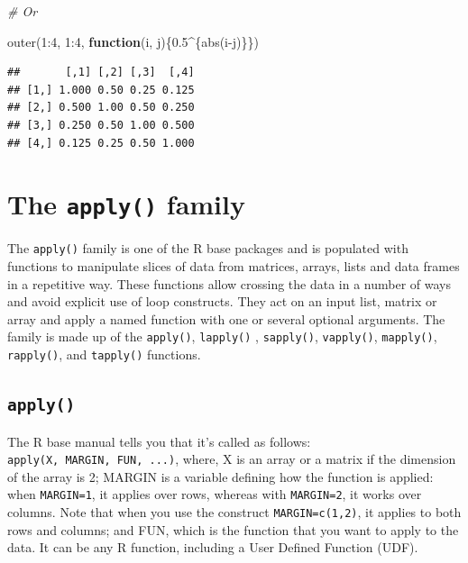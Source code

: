 \documentclass[
]{book}
\newenvironment{Shaded}{\begin{snugshade}}{\end{snugshade}}
\newcommand{\CommentTok}[1]{\textcolor[rgb]{0.56,0.35,0.01}{\textit{#1}}}
\newcommand{\ControlFlowTok}[1]{\textcolor[rgb]{0.13,0.29,0.53}{\textbf{#1}}}
\newcommand{\DecValTok}[1]{\textcolor[rgb]{0.00,0.00,0.81}{#1}}
\newcommand{\FloatTok}[1]{\textcolor[rgb]{0.00,0.00,0.81}{#1}}
\newcommand{\FunctionTok}[1]{\textcolor[rgb]{0.00,0.00,0.00}{#1}}
\newcommand{\NormalTok}[1]{#1}
\newcommand{\SpecialCharTok}[1]{\textcolor[rgb]{0.00,0.00,0.00}{#1}}
\begin{document}
\begin{Shaded}
\begin{Highlighting}[]
\CommentTok{\# Or}

\FunctionTok{outer}\NormalTok{(}\DecValTok{1}\SpecialCharTok{:}\DecValTok{4}\NormalTok{, }\DecValTok{1}\SpecialCharTok{:}\DecValTok{4}\NormalTok{, }\ControlFlowTok{function}\NormalTok{(i, j)\{}\FloatTok{0.5}\SpecialCharTok{\^{}}\NormalTok{\{}\FunctionTok{abs}\NormalTok{(i}\SpecialCharTok{{-}}\NormalTok{j)\}\})}
\end{Highlighting}
\end{Shaded}

\begin{verbatim}
##       [,1] [,2] [,3]  [,4]
## [1,] 1.000 0.50 0.25 0.125
## [2,] 0.500 1.00 0.50 0.250
## [3,] 0.250 0.50 1.00 0.500
## [4,] 0.125 0.25 0.50 1.000
\end{verbatim}

\hypertarget{the-apply-family}{%
\section{\texorpdfstring{The \texttt{apply()} family}{The apply() family}}\label{the-apply-family}}

The \texttt{apply()} family is one of the R base packages and is populated with functions to manipulate slices of data from matrices, arrays, lists and data frames in a repetitive way. These functions allow crossing the data in a number of ways and avoid explicit use of loop constructs. They act on an input list, matrix or array and apply a named function with one or several optional arguments. The family is made up of the \texttt{apply()}, \texttt{lapply()} , \texttt{sapply()}, \texttt{vapply()}, \texttt{mapply()}, \texttt{rapply()}, and \texttt{tapply()} functions.

\hypertarget{apply}{%
\subsection{\texorpdfstring{\texttt{apply()}}{apply()}}\label{apply}}

The R base manual tells you that it's called as follows: \texttt{apply(X,\ MARGIN,\ FUN,\ ...)}, where, X is an array or a matrix if the dimension of the array is 2; MARGIN is a variable defining how the function is applied: when \texttt{MARGIN=1}, it applies over rows, whereas with \texttt{MARGIN=2}, it works over columns. Note that when you use the construct \texttt{MARGIN=c(1,2)}, it applies to both rows and columns; and FUN, which is the function that you want to apply to the data. It can be any R function, including a User Defined Function (UDF).
\end{document}
